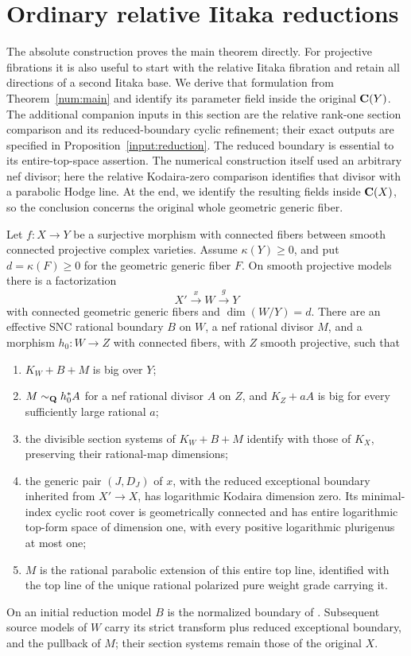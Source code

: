 \section{Ordinary relative Iitaka reductions}\label{ordinary:reductions}

The absolute construction proves the main theorem directly. For
projective fibrations it is also useful to start with the relative
Iitaka fibration and retain all directions of a second Iitaka base.
We derive that formulation from Theorem~\ref{num:main} and
identify its parameter field inside the original $\mathbf C(Y)$. The
additional companion inputs in this section are the relative
rank-one section comparison and its reduced-boundary cyclic refinement;
their exact outputs are specified in Proposition~\ref{input:reduction}.
The reduced boundary is essential to its entire-top-space assertion.
The numerical construction itself used an arbitrary nef divisor;
here the relative Kodaira-zero comparison identifies that divisor
with a parabolic Hodge line. At the end, we identify the resulting
fields inside $\mathbf C(X)$, so the conclusion concerns the original
whole geometric generic fiber.

\begin{proposition}\label{input:reduction}
Let $f:X\to Y$ be a surjective morphism with connected fibers between
smooth connected projective complex varieties. Assume $\kappa(Y)\geq0$,
and put $d=\kappa(F)\geq0$ for the geometric generic fiber $F$. On smooth projective models there is a
factorization
\[
 X'\xrightarrow{x}W\xrightarrow{g}Y
\]
with connected geometric generic fibers and $\dim(W/Y)=d$.
There are an effective SNC rational boundary $B$ on $W$, a nef
rational divisor $M$, and a morphism $h_0:W\to Z$ with connected
fibers, with $Z$ smooth projective, such that
\begin{enumerate}[label=\textup{(\roman*)}]
\item $K_W+B+M$ is big over $Y$;
\item $M\sim_{\mathbf Q}h_0^*A$ for a nef rational divisor $A$ on $Z$,
      and $K_Z+aA$ is big for every sufficiently large rational $a$;
\item the divisible section systems of $K_W+B+M$ identify with
      those of $K_X$, preserving their rational-map dimensions;
\item the generic pair $(J,D_J)$ of $x$, with the reduced exceptional
      boundary inherited from $X'\to X$, has logarithmic Kodaira
      dimension zero. Its minimal-index cyclic root cover is
      geometrically connected and has entire logarithmic top-form
      space of dimension one, with every positive logarithmic
      plurigenus at most one;
\item $M$ is the rational parabolic extension of this entire top
      line, identified with the top line of the unique rational
      polarized pure weight grade carrying it.
\end{enumerate}
On an initial reduction model $B$ is the normalized boundary of
\cite[\PoneNormalization]{SubadditivityCompanion}. Subsequent source models of
$W$ carry its strict transform plus reduced exceptional boundary,
and the pullback of $M$; their section systems remain those of the
original $X$.
\end{proposition}

